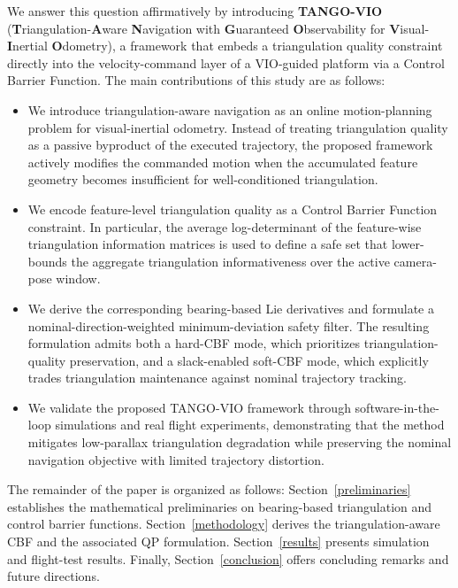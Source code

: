 \documentclass[journal]{IEEEtran}
\begin{document}
We answer this question affirmatively by introducing \textbf{TANGO-VIO} (\textbf{T}riangulation-\textbf{A}ware \textbf{N}avigation with \textbf{G}uaranteed \textbf{O}bservability for \textbf{V}isual-\textbf{I}nertial \textbf{O}dometry), a framework that embeds a triangulation quality constraint directly into the velocity-command layer of a VIO-guided platform via a Control Barrier Function. The main contributions of this study are as follows:

\begin{itemize}

\item We introduce triangulation-aware navigation as an online motion-planning problem for visual-inertial odometry. Instead of treating triangulation quality as a passive byproduct of the executed trajectory, the proposed framework actively modifies the commanded motion when the accumulated feature geometry becomes insufficient for well-conditioned triangulation.

\item We encode feature-level triangulation quality as a Control Barrier Function constraint. In particular, the average log-determinant of the feature-wise triangulation information matrices is used to define a safe set that lower-bounds the aggregate triangulation informativeness over the active camera-pose window.

\item We derive the corresponding bearing-based Lie derivatives and formulate a nominal-direction-weighted minimum-deviation safety filter. The resulting formulation admits both a hard-CBF mode, which prioritizes triangulation-quality preservation, and a slack-enabled soft-CBF mode, which explicitly trades triangulation maintenance against nominal trajectory tracking.

\item We validate the proposed TANGO-VIO framework through software-in-the-loop simulations and real flight experiments, demonstrating that the method mitigates low-parallax triangulation degradation while preserving the nominal navigation objective with limited trajectory distortion.

\end{itemize}


The remainder of the paper is organized as follows: Section~\ref{preliminaries} establishes the mathematical preliminaries on bearing-based triangulation and control barrier functions. Section~\ref{methodology} derives the triangulation-aware CBF and the associated QP formulation. Section~\ref{results} presents simulation and flight-test results. Finally, Section~\ref{conclusion} offers concluding remarks and future directions.
\end{document}
